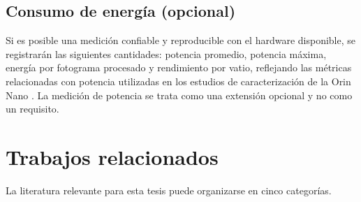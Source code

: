 \subsection{Consumo de energía (opcional)}

Si es posible una medición confiable y reproducible con el hardware
disponible, se registrarán las siguientes cantidades: potencia promedio,
potencia máxima, energía por fotograma procesado y rendimiento por vatio,
reflejando las métricas relacionadas con potencia utilizadas en los estudios
de caracterización de la Orin Nano \cite{zequn2026}. La medición de potencia
se trata como una extensión opcional y no como un requisito.

\section{Trabajos relacionados}
\label{sec:related-work}

La literatura relevante para esta tesis puede organizarse en cinco
categorías.

